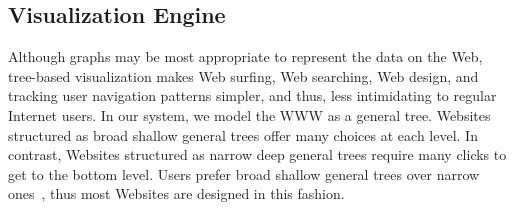 \documentclass[]{article}
\begin{document}
{%


\subsection{Visualization Engine}
\label{se:vizEng}


Although graphs may be most appropriate to represent the data on the Web, tree-based visualization makes Web surfing, Web searching, Web design, and tracking user navigation patterns simpler, and thus, less intimidating to regular Internet users.
In our system, we model the WWW as a general tree.
Websites structured as broad shallow general trees offer many choices at each level.
In contrast, Websites structured as narrow deep general trees require many clicks to get to the bottom level.
Users prefer broad shallow general trees over narrow ones~\cite{mw-04}, thus most Websites are designed in this fashion.

}
\end{document}
